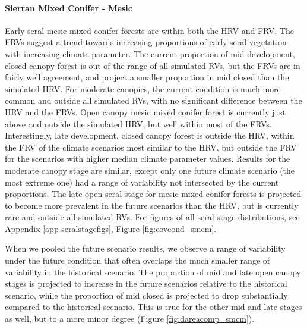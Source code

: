 \documentclass[12pt]{article}
\begin{document}
\begin{spacing}{1}
\paragraph{Sierran Mixed Conifer - Mesic} Early seral mesic mixed conifer forests are within both the HRV and FRV. The FRVs suggest a trend towards increasing proportions of early seral vegetation with increasing climate parameter. The current proportion of mid development, closed canopy forest is out of the range of all simulated RVs, but the FRVs are in fairly well agreement, and project a smaller proportion in mid closed than the simulated HRV. For moderate canopies, the current condition is much more common and outside all simulated RVs, with no significant difference between the HRV and the FRVs. Open canopy mesic mixed conifer forest is currently just above and outside the simulated HRV, but well within most of the FRVs. Interestingly, late development, closed canopy forest is outside the HRV, within the FRV of the climate scenarios most similar to the HRV, but outside the FRV for the scenarios with higher median climate parameter values. Results for the moderate canopy stage are similar, except only one future climate scenario (the most extreme one) had a range of variability not intersected by the current proportions. The late open seral stage for mesic mixed conifer forests is projected to become more prevalent in the future scenarios than the HRV, but is currently rare and outside all simulated RVs. For figures of all seral stage distributions, see Appendix \ref{app-seralstagefigs}, Figure \ref{fig:covcond_smcm}.

When we pooled the future scenario results, we observe a range of variability under the future condition that often overlaps the much smaller range of variability in the historical scenario. The proportion of mid and late open canopy stages is projected to increase in the future scenarios relative to the historical scenario, while the proportion of mid closed is projected to drop substantially compared to the historical scenario. This is true for the other mid and late stages as well, but to a more minor degree (Figure \ref{fig:dareacomp_smcm}).


\end{spacing}
\end{document}
